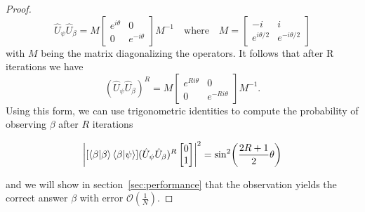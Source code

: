 \begin{proof}
\begin{equation*}
    \hat{U}_\psi\hat{U}_\beta = M  \begin{bmatrix}
    e^{i\theta} & 0 \\
    0 & e^{-i\theta}
    \end{bmatrix}  M^{-1} \quad \text{where} \quad M = \begin{bmatrix}
    -i & i \\
    e^{i\theta/2} & e^{-i\theta/2}
    \end{bmatrix}
  \end{equation*}
 with $M$ being the matrix diagonalizing the operators. It follows that after R iterations we have
\begin{equation*}
    (\hat{U}_\psi\hat{U}_\beta)^R = M  \begin{bmatrix}
    e^{Ri\theta} & 0 \\
    0 & e^{-Ri\theta}
    \end{bmatrix}  M^{-1}.
\end{equation*}
Using this form, we can use trigonometric identities to compute the probability of observing $\beta$ after $R$ iterations

\begin{equation*}
   \abs*{ [\braket{\beta | \beta} \braket{\beta | \psi}]
     (\hat{U}_\psi\hat{U}_\beta)^R \begin{bmatrix}
     0 \\ 1
     \end{bmatrix} }^2= \sin^2\biggl(\frac{2R+1}{2}\theta\biggr)
\end{equation*}

and we will show in section~\ref{sec:performance} that the observation yields the correct answer $\beta$ with error $\mathcal{O}(\frac{1}{N})$.
\end{proof}